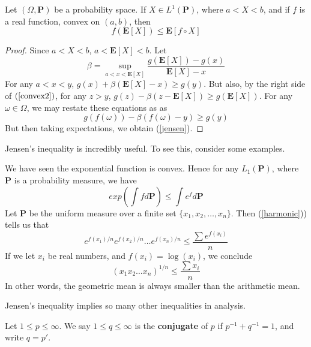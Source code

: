 \begin{theorem}
    Let $(\Omega, \mathbf{P})$ be a probability space. If $X \in L^1(\mathbf{P})$, where $a < X< b$, and if $f$ is a real function, convex on $(a,b)$, then
    \begin{equation} \label{jensen} f(\mathbf{E}[X]) \leq \mathbf{E}[f \circ X] \end{equation}
\end{theorem}
\begin{proof}
    Since $a < X < b$, $a < \mathbf{E}[X] < b$. Let
    \[ \beta = \sup_{a < x < \mathbf{E}[X]} \frac{g(\mathbf{E}[X]) - g(x)}{\mathbf{E}[X] - x} \]
    For any $a < x < y$, $g(x) + \beta(\mathbf{E}[X] - x) \geq g(y)$. But also, by the right side of $(\ref{convex2})$, for any $z > y$, $g(z) - \beta(z - \mathbf{E}[X]) \geq g(\mathbf{E}[X])$. For any $\omega \in \Omega$, we may restate these equations as as
    \[ g(f(\omega)) - \beta(f(\omega) - y) \geq g(y) \]
    But then taking expectations, we obtain (\ref{jensen}).
\end{proof}

Jensen's inequality is incredibly useful. To see this, consider some examples.

\begin{example}
    We have seen the exponential function is convex. Hence for any $L_1(\mathbf{P})$, where $\mathbf{P}$ is a probability measure, we have
    \begin{equation} \label{harmonic} exp\left(\int f d\mathbf{P} \right) \leq \int e^f d\mathbf{P} \end{equation}
    Let $\mathbf{P}$ be the uniform measure over a finite set $\{ x_1, x_2, \dots, x_n \}$. Then (\ref{harmonic})) tells us that
    \[ e^{f(x_1)/n}e^{f(x_2)/n} \dots e^{f(x_n)/n} \leq \frac{\sum e^{f(x_i)}}{n} \]
    If we let $x_i$ be real numbers, and $f(x_i) = \log(x_i)$, we conclude
    \[ (x_1x_2 \dots x_n)^{1/n} \leq \frac{\sum x_i}{n} \]
    In other words, the geometric mean is always smaller than the arithmetic mean.
\end{example}

Jensen's inequality implies so many other inequalities in analysis.

    Let $1 \leq p \leq \infty$. We say $1 \leq q \leq \infty$ is the {\bf conjugate} of $p$ if $p^{-1} + q^{-1} = 1$, and write $q = p'$.

